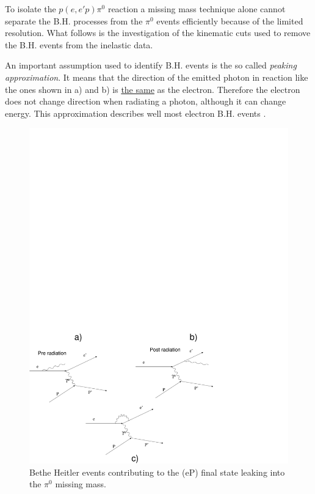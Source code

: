 To isolate the $p(e, e'p)\pi^0$ reaction a missing mass technique alone cannot separate
the B.H. processes from the $\pi^0$ events efficiently because of the limited resolution.
What follows is the investigation of the kinematic cuts used to remove the B.H. events from
the inelastic data.

An important assumption used to identify B.H. events is the so called {\it peaking approximation}. It means that
the direction of the emitted photon in reaction like the ones shown in  a) and b) 
is \underline{the same} as the electron. Therefore the electron does not change direction when radiating a photon, 
although it can change energy. This approximation describes well most electron B.H. events \cite{bib:motsai}.

\begin{figure}[h]
 \begin{center}
 \includegraphics[width = 12cm, bb=-100 -20 570 350]{data_reduction/img/bethe} 
  \caption[Bethe Heitler events contributing to the (eP) final state]
          { Bethe Heitler events contributing to the (eP) final state leaking into
                the $\pi^0$ missing mass.}
 \label{fig:bethe}
 \end{center}
\end{figure}
 
